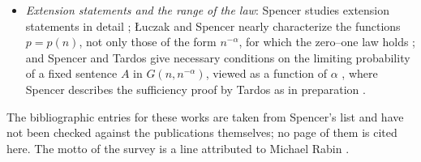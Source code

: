 \begin{itemize}
  random ordered graph, are in Compton, Henson and Shelah
  \cite{ComptonHensonShelah1987}; Shelah shows that on the random ordered
  graph no first-order sentence almost surely encodes evenness of the size
  \cite{Shelah1995VeryWeak}; and Hella, Kolaitis and Luosto study almost sure
  equivalence of logics in general \cite{HellaKolaitisLuosto1996}.
\item \emph{Extension statements and the range of the law}: Spencer studies
  extension statements in detail \cite{Spencer1990ThresholdExtension};
  {\L}uczak and Spencer nearly characterize the functions \(p=p(n)\), not only
  those of the form \(n^{-\alpha}\), for which the zero--one law holds
  \cite{LuczakSpencer1991WhenZeroOne}; and Spencer and Tardos give necessary
  conditions on the limiting probability of a fixed sentence \(A\) in
  \(G(n,n^{-\alpha})\), viewed as a function of \(\alpha\)
  \cite{SpencerTardosUpsDownsSubmitted},
  where Spencer describes the sufficiency proof by Tardos as in preparation
  \cite[p.~28]{Spencer2007LogicRandomStructuresAuthor}.
\end{itemize}
The bibliographic entries for these works are taken from Spencer's list and
have not been checked against the publications themselves; no page of them
is cited here.  The motto of the survey is a line attributed to Michael Rabin
\cite[p.~1]{Spencer2007LogicRandomStructuresAuthor}.
